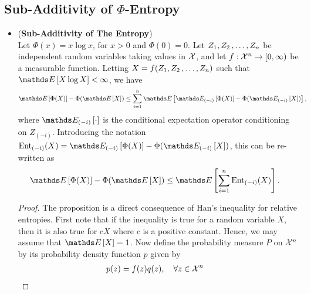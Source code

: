 \documentclass[11pt]{article}
\begin{document}
\subsection{Sub-Additivity of $\Phi$-Entropy}
\begin{itemize}

\item \begin{proposition} (\textbf{Sub-Additivity of The Entropy}) \citep{boucheron2013concentration}\\
Let $\Phi(x) = x\log x$,  for $x >0$ and $\Phi(0) = 0$. Let $Z_1, Z_2 \,{,}\ldots{,}\, Z_n$ be independent random variables taking values in ${\mathcal X}$, and let $f: {\mathcal X}^n \to [0, \infty)$ be a measurable function. Letting $X = f(Z_1, Z_2 \,{,}\ldots{,}\, Z_n)$ such that $\E{}{X\log X} < \infty$, we have 
\begin{align}
\E{}{\Phi(X)} - \Phi(\E{}{X}) &\le \sum_{i=1}^{n}\E{}{\E{(-i)}{\Phi(X)} - \Phi(\E{(-i)}{X})}, \label{ineqn: sub_additivity_phi_entropy}
\end{align} where $\E{(-i)}{\cdot}$ is the conditional expectation operator conditioning on $Z_{(-i)}$. Introducing the notation $\text{Ent}_{(-i)}(X) = \E{(-i)}{\Phi(X)} - \Phi(\E{(-i)}{X})$, this can be re-written as
\begin{align}
\E{}{\Phi(X)} - \Phi(\E{}{X}) &\le \E{}{\sum_{i=1}^{n} \text{Ent}_{(-i)}(X)}. \label{ineqn: sub_additivity_phi_entropy_2}
\end{align}
\end{proposition}
\begin{proof}
The proposition is a direct consequence of Han's inequality for relative entropies. First note that if the inequality is true for a random variable $X$, then it is also true for $cX$ where $c$ is a positive constant. Hence, we may assume that $\E{}{X} = 1$. Now define the probability measure $P$ on ${\mathcal X}^n$ by its probability density function $p$ given by
\begin{align*}
p(z) &= f(z) q(z), \quad \forall z \in \cX^n

\end{align*}
\end{proof}
\end{itemize}
\end{document}
